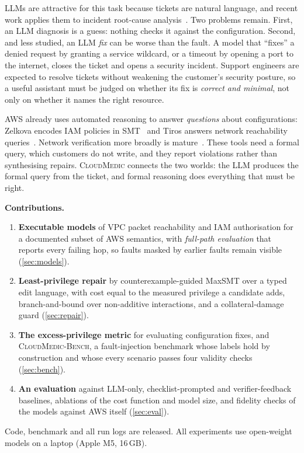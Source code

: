 \documentclass[conference]{IEEEtran}
\newcommand{\sys}{\textsc{CloudMedic}}
\newcommand{\bench}{\textsc{CloudMedic-Bench}}
\begin{document}
LLMs are attractive for this task because tickets are natural language, and recent work applies them to incident root-cause
analysis~\cite{ahmed2023recommending,chen2024rcacopilot}. Two problems remain. First, an LLM diagnosis is a guess: nothing
checks it against the configuration. Second, and less studied, an LLM \emph{fix} can be worse than the fault. A model that
``fixes'' a denied request by granting a service wildcard, or a timeout by opening a port to the internet, closes the ticket
and opens a security incident. Support engineers are expected to resolve tickets without weakening the customer's security
posture, so a useful assistant must be judged on whether its fix is \emph{correct and minimal}, not only on whether it names
the right resource.

AWS already uses automated reasoning to answer \emph{questions} about configurations: Zelkova encodes IAM policies in
SMT~\cite{backes2018semantic} and Tiros answers network reachability queries~\cite{backes2019reachability}. Network
verification more broadly is mature~\cite{kazemian2012hsa,fogel2015batfish}. These tools need a formal query, which customers
do not write, and they report violations rather than synthesising repairs. \sys{} connects the two worlds: the LLM produces
the formal query from the ticket, and formal reasoning does everything that must be right.

\textbf{Contributions.}
\begin{enumerate}
\item \textbf{Executable models} of VPC packet reachability and IAM authorisation for a documented subset of AWS semantics,
with \emph{full-path evaluation} that reports every failing hop, so faults masked by earlier faults remain visible (\cref{sec:models}).
\item \textbf{Least-privilege repair} by counterexample-guided MaxSMT over a typed edit language, with cost equal to the
measured privilege a candidate adds, branch-and-bound over non-additive interactions, and a collateral-damage guard (\cref{sec:repair}).
\item \textbf{The excess-privilege metric} for evaluating configuration fixes, and \bench{}, a fault-injection benchmark whose
labels hold by construction and whose every scenario passes four validity checks (\cref{sec:bench}).
\item \textbf{An evaluation} against LLM-only, checklist-prompted and verifier-feedback baselines, ablations of the cost function
and model size, and fidelity checks of the models against AWS itself (\cref{sec:eval}).
\end{enumerate}
Code, benchmark and all run logs are released. All experiments use open-weight models on a laptop (Apple M5, 16\,GB).
\end{document}
